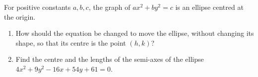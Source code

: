 For positive constants $a,b,c$, the graph of $ax^2+by^2=c$ is an ellipse centred at the origin.
\begin{enumerate}
\item[(a)] How should the equation be changed to move the ellipse, without changing its shape, so that its centre is the point $(h,k)$?
\item[(b)] Find the centre and the lengths of the semi-axes of the ellipse $4x^2+9y^2-16x+54y+61=0$.
\end{enumerate}
